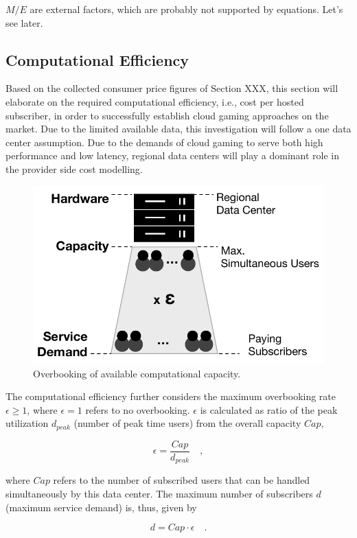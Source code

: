 $M / E$ are external factors, which are probably not supported by equations. Let's see later.


\subsection{Computational Efficiency}

Based on the collected consumer price figures of Section XXX, this section will elaborate on the required computational efficiency, i.e., cost per hosted subscriber, in order to successfully establish cloud gaming approaches on the market. Due to the limited available data, this investigation will follow a one data center assumption. Due to the demands of cloud gaming to serve both high performance and low latency, regional data centers will play a dominant role in the provider side cost modelling. 

\begin{figure}[!t]
	\centering
	\includegraphics[width=0.65\columnwidth]{images/overbooking_datacenter.pdf}
	\caption{Overbooking of available computational capacity.}
\label{fig:overbooking_datacenter}
\end{figure}

The computational efficiency further considers the maximum overbooking rate $\epsilon \geq 1$, where $\epsilon = 1$ refers to no overbooking. $\epsilon$ is calculated as ratio of the peak utilization $d_{peak}$ (number of peak time users) from the overall capacity $Cap$, 

\begin{equation}
	\epsilon = \frac{Cap}{d_{peak}} \quad ,
\end{equation}

where $Cap$ refers to the number of subscribed users that can be handled simultaneously by this data center. The maximum number of subscribers $d$ (maximum service demand) is, thus, given by

\begin{equation}
	 d = Cap \cdot \epsilon \quad .
\end{equation}

